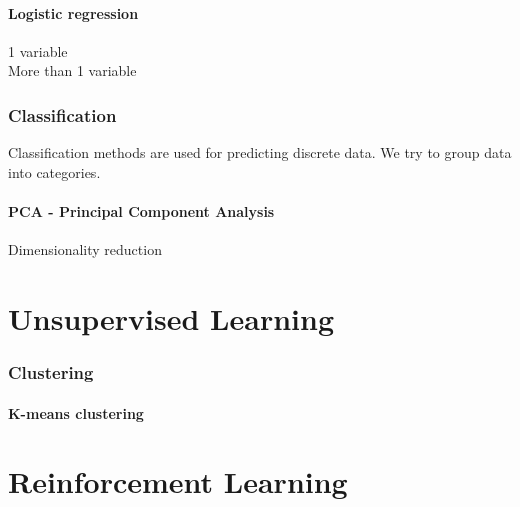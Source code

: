 \documentclass{scrartcl}
\begin{document}
\subsection{Logistic regression}

1 variable\\
More than 1 variable

\section{Classification}

Classification methods are used for predicting discrete data. We try to 
group data into categories.

\subsection{PCA - Principal Component Analysis}

Dimensionality reduction

\newpage
\part{Unsupervised Learning}

\section{Clustering}

\subsection{K-means clustering}

\newpage
\part{Reinforcement Learning}
\end{document}

